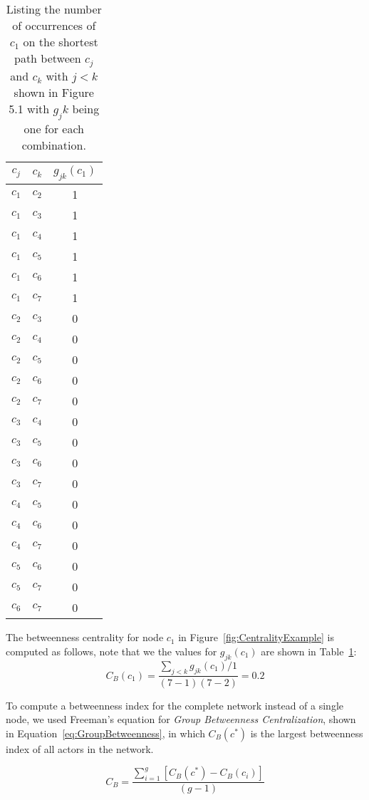 \begin{table}[t]
\centering
\caption{Listing the number of occurrences of $c_1$ on the shortest path between $c_j$ and $c_k$ with $j<k$ shown in Figure 5.1 with $g_jk$ being one for each combination.}
\begin{tabular}{ccc}
\toprule
$c_j$ & $c_k$ & $g_{jk}(c_1)$\\
\midrule
$c_1$&$c_2$&1\\
$c_1$&$c_3$&1\\
$c_1$&$c_4$&1\\
$c_1$&$c_5$&1\\
$c_1$&$c_6$&1\\
$c_1$&$c_7$&1\\
$c_2$&$c_3$&0\\
$c_2$&$c_4$&0\\
$c_2$&$c_5$&0\\
$c_2$&$c_6$&0\\
$c_2$&$c_7$&0\\
$c_3$&$c_4$&0\\
$c_3$&$c_5$&0\\
$c_3$&$c_6$&0\\
$c_3$&$c_7$&0\\
$c_4$&$c_5$&0\\
$c_4$&$c_6$&0\\
$c_4$&$c_7$&0\\
$c_5$&$c_6$&0\\
$c_5$&$c_7$&0\\
$c_6$&$c_7$&0\\
\bottomrule
\end{tabular}
\label{tab:between}
\end{table}

The betweenness centrality for node $c_1$ in Figure~\ref{fig:CentralityExample} is computed as follows, note that we the values for $g_{jk}(c_1)$ are shown in Table~\ref{tab:between}:
\begin{equation}
\displaystyle C_B(c_1) = \frac{\sum_{j<k} g_{jk}(c_1)/1}{(7-1)(7-2)} = 0.2
\end{equation}

To compute a betweenness index for the complete network instead of a single node,
we used Freeman's equation for \emph{Group Betweenness Centralization}, shown in Equation~\ref{eq:GroupBetweenness}, in which $C_B(c^*)$ is
the largest betweenness index of all actors in the network.

\begin{equation}
\displaystyle C_B =  \frac{\sum_{i=1}^g[C_B(c^*)-C_B(c_i)]}{(g-1)}
\label{eq:GroupBetweenness}
\end{equation}


